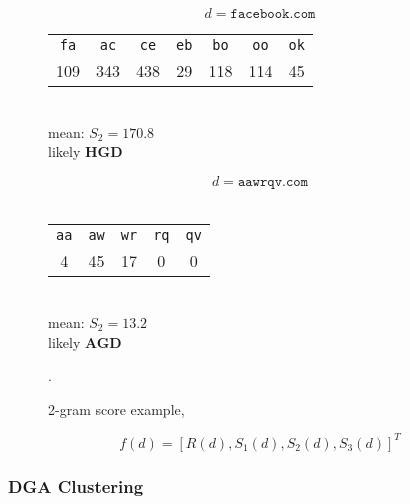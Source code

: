 \begin{figure}[!htp]
\begin{minipage}{0.5\textwidth}
    \centering
    $$ d = \mathtt{facebook.com}$$\vspace{-0.2cm}
    \begin{scriptsize}
        \begin{tabular}{c c c c c c c}
          \texttt{fa} & \texttt{ac} & \texttt{ce} & \texttt{eb} & \texttt{bo}  & \texttt{oo}  & \texttt{ok}\\
          109 & 343 & 438 & 29 & 118 & 114 & 45
        \end{tabular}\end{scriptsize}\\
        \vspace{0.5cm}
        mean: $S_2 = 170.8$
        \vspace{0.3cm} \\ likely \textbf{HGD}
\end{minipage}%
\begin{minipage}{0.5\textwidth}
        \centering
        $$ d = \mathtt{aawrqv.com}$$\vspace{-0.2cm}\\
        \begin{scriptsize}
        \begin{tabular}{ c c c c c }
          \texttt{aa} & \texttt{aw} & \texttt{wr} & \texttt{rq} & \texttt{qv}\\
          4 & 45 & 17 & 0 & 0
        \end{tabular}\end{scriptsize}\\
        \vspace{0.5cm}
        mean: $S_2 = 13.2$
        \vspace{0.3cm} \\ likely \textbf{AGD}
\end{minipage}
\caption{2-gram score example, \citet{schiavoni2013}}.
\end{figure}

\begin{equation} \label{eq:feature_vector}
    f\left(d\right) = \left[R\left(d\right), S_1\left(d\right),
    S_2\left(d\right), S_3\left(d\right)\right]^T
\end{equation}


\subsubsection{DGA Clustering} %
\label{ssub:dga_clustering}

